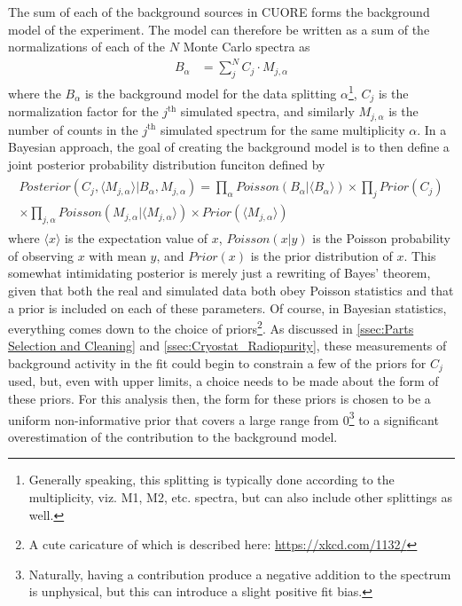 The sum of each of the background sources in CUORE forms the background model of the experiment.
The model can therefore be written as a sum of the normalizations of each of the $N$ Monte Carlo spectra as
\begin{align}
    B_\alpha &= \sum_j^N C_{j} \cdot M_{j,\alpha} 
\end{align}
where the $B_{\alpha}$ is the background model for the data splitting $\alpha$\footnote{Generally speaking, this splitting is typically done according to the multiplicity, viz. M1, M2, etc. spectra, but can also include other splittings as well.}, $C_{j}$ is the normalization factor for the $j^{\textrm{th}}$ simulated spectra, and similarly $M_{j,\alpha}$ is the number of counts in the $j^{\textrm{th}}$ simulated spectrum for the same multiplicity $\alpha$.
In a Bayesian approach, the goal of creating the background model is to then define a joint posterior probability distribution funciton defined by
\begin{align}
\begin{split}
        Posterior(C_j, \langle M_{j,\alpha}\rangle|B_\alpha, M_{j,\alpha}) = \prod_\alpha Poisson(B_\alpha|\langle B_\alpha\rangle)\times \prod_j Prior(C_j) \\ \times \prod_{j, \alpha}Poisson(M_{j,\alpha}|\langle M_{j,\alpha}\rangle) \times Prior(\langle M_{j,\alpha}\rangle)
\end{split}
\end{align}
where $\langle x \rangle$ is the expectation value of $x$, $Poisson(x|y)$ is the Poisson probability of observing $x$ with mean $y$, and $Prior(x)$ is the prior distribution of $x$.
This somewhat intimidating posterior is merely just a rewriting of Bayes' theorem, given that both the real and simulated data both obey Poisson statistics and that a prior is included on each of these parameters.
Of course, in Bayesian statistics, everything comes down to the choice of priors\footnote{\RaggedRight A cute caricature of which is described here: \url{https://xkcd.com/1132/}}.
As discussed in \autoref{ssec:Parts Selection and Cleaning} and \autoref{ssec:Cryostat_Radiopurity}, these measurements of background activity in the fit could begin to constrain a few of the priors for $C_j$ used, but, even with upper limits, a choice needs to be made about the form of these priors.
For this analysis then, the form for these priors is chosen to be a uniform non-informative prior that covers a large range from 0\footnote{Naturally, having a contribution produce a negative addition to the spectrum is unphysical, but this can introduce a slight positive fit bias.} to a significant overestimation of the contribution to the background model.
